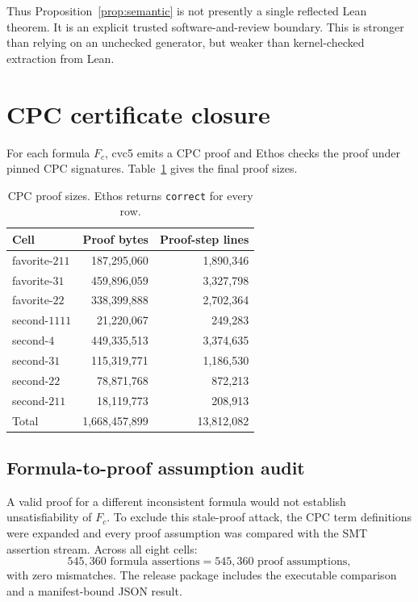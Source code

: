 \documentclass[11pt]{article}
\theoremstyle{definition}
\begin{document}
Thus Proposition~\ref{prop:semantic} is not presently a single reflected Lean
theorem. It is an explicit trusted software-and-review boundary. This is
stronger than relying on an unchecked generator, but weaker than
kernel-checked extraction from Lean.

\section{CPC certificate closure}\label{sec:certificates}

For each formula $F_c$, cvc5 emits a CPC proof and Ethos checks the proof
under pinned CPC signatures. Table~\ref{tab:proofs} gives the final proof
sizes.

\begin{table}[ht]
\centering
\small
\begin{tabular}{@{}lrr@{}}
\toprule
Cell & Proof bytes & Proof-step lines\\
\midrule
favorite-$211$ & 187,295,060 & 1,890,346\\
favorite-$31$ & 459,896,059 & 3,327,798\\
favorite-$22$ & 338,399,888 & 2,702,364\\
second-$1111$ & 21,220,067 & 249,283\\
second-$4$ & 449,335,513 & 3,374,635\\
second-$31$ & 115,319,771 & 1,186,530\\
second-$22$ & 78,871,768 & 872,213\\
second-$211$ & 18,119,773 & 208,913\\
\midrule
Total & 1,668,457,899 & 13,812,082\\
\bottomrule
\end{tabular}
\caption{CPC proof sizes. Ethos returns \texttt{correct} for every row.}
\label{tab:proofs}
\end{table}

\subsection{Formula-to-proof assumption audit}

A valid proof for a different inconsistent formula would not establish
unsatisfiability of $F_c$. To exclude this stale-proof attack, the CPC term
definitions were expanded and every proof assumption was compared with the
SMT assertion stream. Across all eight cells:
\[
  545,360\text{ formula assertions}
  =
  545,360\text{ proof assumptions},
\]
with zero mismatches. The release package includes the executable comparison
and a manifest-bound JSON result.
\end{document}
